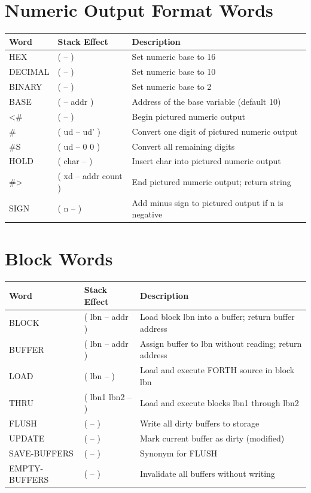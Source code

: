 \section*{Numeric Output Format Words}
\begin{longtable}{>{\ttfamily}lp{4.5cm}p{7cm}}
\toprule
\normalfont Word & Stack Effect & Description \\
\midrule
\endhead
\bottomrule
\endfoot
HEX     & ( -- )              & Set numeric base to 16 \\
DECIMAL & ( -- )              & Set numeric base to 10 \\
BINARY  & ( -- )              & Set numeric base to 2 \\
BASE    & ( -- addr )         & Address of the base variable (default 10) \\
<\#     & ( -- )              & Begin pictured numeric output \\
\#      & ( ud -- ud' )       & Convert one digit of pictured numeric output \\
\#S     & ( ud -- 0 0 )       & Convert all remaining digits \\
HOLD    & ( char -- )         & Insert char into pictured numeric output \\
\#>     & ( xd -- addr count ) & End pictured numeric output; return string \\
SIGN    & ( n -- )            & Add minus sign to pictured output if n is negative \\
\end{longtable}

\section*{Block Words}
\begin{longtable}{>{\ttfamily}lp{4.5cm}p{7cm}}
\toprule
\normalfont Word & Stack Effect & Description \\
\midrule
\endhead
\bottomrule
\endfoot
BLOCK   & ( lbn -- addr )     & Load block lbn into a buffer; return buffer address \\
BUFFER  & ( lbn -- addr )     & Assign buffer to lbn without reading; return address \\
LOAD    & ( lbn -- )          & Load and execute FORTH source in block lbn \\
THRU    & ( lbn1 lbn2 -- )    & Load and execute blocks lbn1 through lbn2 \\
FLUSH   & ( -- )              & Write all dirty buffers to storage \\
UPDATE  & ( -- )              & Mark current buffer as dirty (modified) \\
SAVE-BUFFERS & ( -- )         & Synonym for FLUSH \\
EMPTY-BUFFERS & ( -- )        & Invalidate all buffers without writing \\
\end{longtable}

